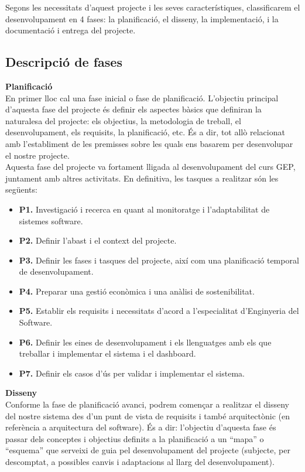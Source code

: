 Segons les necessitats d’aquest projecte i les seves característiques, classificarem el desenvolupament en 4 fases: la planificació, el disseny, la implementació, i la documentació i entrega del projecte. 

\subsection{Descripció de fases}

\noindent \textbf{\large Planificació}\\

\noindent En primer lloc cal una fase inicial o fase de planificació. L’objectiu principal d’aquesta fase del projecte és definir els aspectes bàsics que definiran la naturalesa del projecte: els objectius, la metodologia de treball, el desenvolupament, els requisits, la planificació, etc. És a dir, tot allò relacionat amb l’establiment de les premisses sobre les quals ens basarem per desenvolupar el nostre projecte. \\

Aquesta fase del projecte va fortament lligada al desenvolupament del curs GEP, juntament amb altres activitats. En definitiva, les tasques a realitzar són les següents:

\begin{itemize}
\item \textbf{P1.} Investigació i recerca en quant al monitoratge i l’adaptabilitat de sistemes software.
\item \textbf{P2.} Definir l’abast i el context del projecte. 
\item \textbf{P3.} Definir les fases i tasques del projecte, així com una planificació temporal de desenvolupament.
\item \textbf{P4.} Preparar una gestió econòmica i una anàlisi de sostenibilitat.
\item \textbf{P5.} Establir els requisits i necessitats d’acord a l’especialitat d’Enginyeria del Software.
\item \textbf{P6.} Definir les eines de desenvolupament i els llenguatges amb els que treballar i implementar el sistema i el dashboard.
\item \textbf{P7.} Definir els casos d'ús per validar i implementar el sistema.
\end{itemize}

\noindent \textbf{\large Disseny}\\

Conforme la fase de planificació avanci, podrem començar a realitzar el disseny del nostre sistema des d’un punt de vista de requisits i també arquitectònic (en referència a arquitectura del software). És a dir: l’objectiu d’aquesta fase és passar dels conceptes i objectius definits a la planificació a un “mapa” o “esquema” que serveixi de guia pel desenvolupament del projecte (subjecte, per descomptat, a possibles canvis i adaptacions al llarg del desenvolupament). \\

